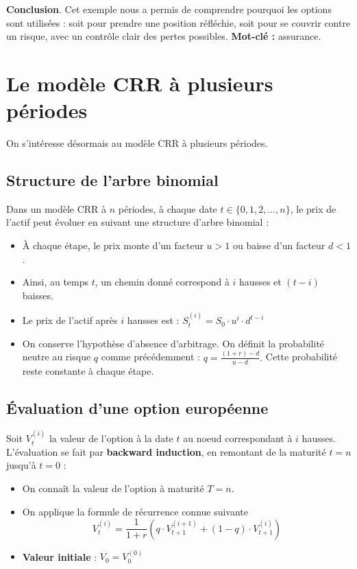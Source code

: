 \documentclass[12pt,a4paper]{article}
\begin{document}
\textbf{Conclusion}. Cet exemple nous a permis de comprendre pourquoi les options sont utilisées : soit pour prendre une position réfléchie, soit pour se couvrir contre un risque, avec un contrôle clair des pertes possibles. \textbf{Mot-clé :} assurance.

\section{Le modèle CRR à plusieurs périodes}

On s'intéresse désormais au modèle CRR à plusieurs périodes.

\subsection{Structure de l'arbre binomial}
Dans un modèle CRR à $n$ périodes, à chaque date $t \in \{0,1,2,\dots,n\}$, le prix de l'actif peut évoluer en suivant une structure d'arbre binomial :

\begin{itemize}
    \item À chaque étape, le prix monte d'un facteur $u > 1$ ou baisse d'un facteur $d < 1$.
    \item Ainsi, au temps $t$, un chemin donné correspond à $i$ hausses et $(t-i)$ baisses.
    \item Le prix de l'actif après $i$ hausses est :
    \(
    \boxed{S_t^{(i)} = S_0 \cdot u^i \cdot d^{t-i}}
    \)
    \item On conserve l'hypothèse d'absence d'arbitrage. On définit la probabilité neutre au risque $q$ comme précédemment :
    \(
    q = \frac{(1 + r) - d}{u - d}.
    \)
    Cette probabilité reste constante à chaque étape.
\end{itemize}


\subsection{Évaluation d'une option européenne}
Soit $V_t^{(i)}$ la valeur de l'option à la date $t$ au noeud correspondant à $i$ hausses.
L'évaluation se fait par \textbf{backward induction}, en remontant de la maturité $t = n$ jusqu'à $t = 0$ :

\begin{itemize}
  \item On connaît la valeur de l'option à maturité $T = n$.
  \item On applique la formule de récurrence connue suivante
  \[
    V_t^{(i)} = \frac{1}{1 + r} \left( q \cdot V_{t+1}^{(i+1)} + (1 - q) \cdot V_{t+1}^{(i)} \right)
  \]
  \item \textbf{Valeur initiale} : $V_0 = V_0^{(0)}$
\end{itemize}
\end{document}

